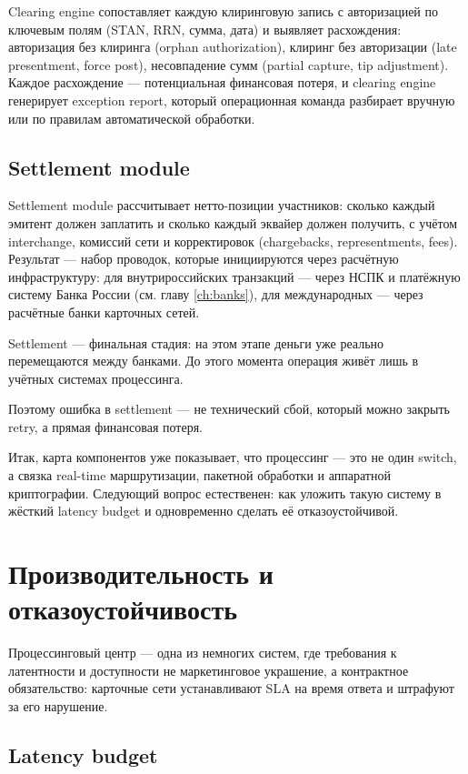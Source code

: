 Clearing engine сопоставляет каждую клиринговую запись с авторизацией по ключевым полям (STAN, RRN, сумма, дата) и
выявляет расхождения: авторизация без клиринга (orphan authorization), клиринг без авторизации (late presentment, force
post), несовпадение сумм (partial capture, tip adjustment). Каждое расхождение — потенциальная финансовая потеря, и
clearing engine генерирует exception report, который операционная команда разбирает вручную или по правилам
автоматической обработки.

\subsection*{Settlement module}

Settlement module рассчитывает нетто-позиции участников: сколько каждый эмитент должен заплатить и сколько каждый
эквайер должен получить, с учётом interchange, комиссий сети и корректировок (chargebacks, representments, fees).
Результат — набор проводок, которые инициируются через расчётную инфраструктуру: для внутрироссийских транзакций —
через НСПК и платёжную систему Банка России (см. главу \ref{ch:banks}), для международных — через расчётные банки
карточных сетей.

Settlement — финальная стадия: на этом этапе деньги уже реально перемещаются между банками. До этого момента операция
живёт лишь в учётных системах процессинга.

Поэтому ошибка в settlement — не технический сбой,
который можно закрыть retry, а прямая финансовая потеря.

Итак, карта компонентов уже показывает, что процессинг — это
не один switch, а связка real-time маршрутизации, пакетной
обработки и аппаратной криптографии. Следующий вопрос естественен:
как уложить такую систему в жёсткий latency budget и одновременно
сделать её отказоустойчивой.

\section{Производительность и отказоустойчивость}
\label{sec:pc-performance}

Процессинговый центр — одна из немногих систем, где требования
к латентности и доступности не маркетинговое украшение,
а контрактное обязательство: карточные сети устанавливают SLA
на время ответа и штрафуют за его нарушение.

\subsection*{Latency budget}

